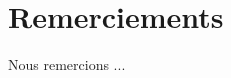 \documentclass[12pt,a4paper,oneside, titlepage]{report}
\begin{document}
{}
\chapter*{Remerciements}
\renewcommand{\leftmark}{REMERCIEMENTS}

Nous remercions ...\\

\newpage
\renewcommand{\leftmark}{TABLE DES MATI\`{E}RES}
\thispagestyle{fancy}
\tableofcontents
{}

















\newpage
\appendix
{}



\end{document}
